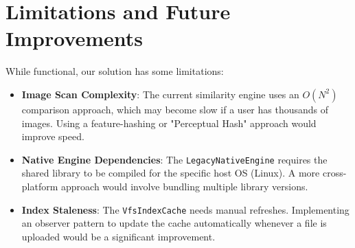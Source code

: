 \section{Limitations and Future Improvements}
While functional, our solution has some limitations:

\begin{itemize}
    \item \textbf{Image Scan Complexity}: The current similarity engine uses an $O(N^2)$ comparison approach, which may become slow if a user has thousands of images. Using a feature-hashing or "Perceptual Hash" approach would improve speed.
    \item \textbf{Native Engine Dependencies}: The \texttt{LegacyNativeEngine} requires the shared library to be compiled for the specific host OS (Linux). A more cross-platform approach would involve bundling multiple library versions.
    \item \textbf{Index Staleness}: The \texttt{VfsIndexCache} needs manual refreshes. Implementing an observer pattern to update the cache automatically whenever a file is uploaded would be a significant improvement.
\end{itemize}
